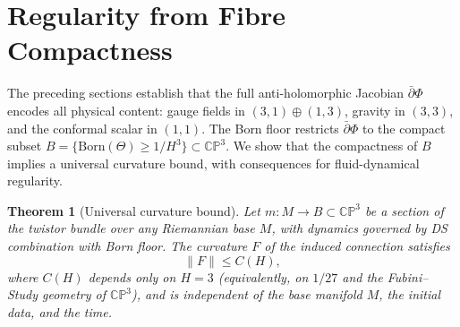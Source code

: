 \documentclass[11pt,a4paper]{article}
\newtheorem{theorem}{Theorem}[section]
\theoremstyle{definition}
\theoremstyle{remark}
\newcommand{\CP}{\mathbb{CP}}
\newcommand{\dbar}{\bar{\partial}}
\begin{document}
\section{Regularity from Fibre Compactness}\label{sec:regularity}

The preceding sections establish that the full anti-holomorphic Jacobian $\dbar\Phi$ encodes all physical content: gauge fields in $(3,1)\oplus(1,3)$, gravity in $(3,3)$, and the conformal scalar in $(1,1)$. The Born floor restricts $\dbar\Phi$ to the compact subset $B=\{\mathrm{Born}(\Theta)\geq 1/H^3\}\subset\CP^3$. We show that the compactness of $B$ implies a universal curvature bound, with consequences for fluid-dynamical regularity.

\begin{theorem}[Universal curvature bound]\label{thm:curvature_bound}
Let $m:M\to B\subset\CP^3$ be a section of the twistor bundle over any Riemannian base $M$, with dynamics governed by DS combination with Born floor. The curvature $F$ of the induced connection satisfies
\begin{equation}\label{eq:curv_bound}
\|F\|\leq C(H),
\end{equation}
where $C(H)$ depends only on $H=3$ (equivalently, on $1/27$ and the Fubini--Study geometry of $\CP^3$), and is independent of the base manifold $M$, the initial data, and the time.
\end{theorem}
\end{document}
